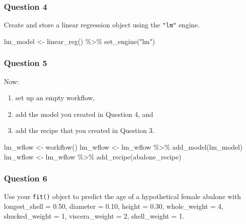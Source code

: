 \documentclass[
]{article}
\newenvironment{Shaded}{\begin{snugshade}}{\end{snugshade}}
\newcommand{\FunctionTok}[1]{\textcolor[rgb]{0.00,0.00,0.00}{#1}}
\newcommand{\NormalTok}[1]{#1}
\newcommand{\OtherTok}[1]{\textcolor[rgb]{0.56,0.35,0.01}{#1}}
\newcommand{\SpecialCharTok}[1]{\textcolor[rgb]{0.00,0.00,0.00}{#1}}
\newcommand{\StringTok}[1]{\textcolor[rgb]{0.31,0.60,0.02}{#1}}
\begin{document}
\hypertarget{question-4}{%
\subsubsection{Question 4}\label{question-4}}

Create and store a linear regression object using the \texttt{"lm"}
engine.

\begin{Shaded}
\begin{Highlighting}[]
\NormalTok{lm\_model }\OtherTok{\textless{}{-}} \FunctionTok{linear\_reg}\NormalTok{() }\SpecialCharTok{\%\textgreater{}\%} \FunctionTok{set\_engine}\NormalTok{(}\StringTok{"lm"}\NormalTok{)}
\end{Highlighting}
\end{Shaded}

\hypertarget{question-5}{%
\subsubsection{Question 5}\label{question-5}}

Now:

\begin{enumerate}
\def\labelenumi{\arabic{enumi}.}
\item
  set up an empty workflow,
\item
  add the model you created in Question 4, and
\item
  add the recipe that you created in Question 3.
\end{enumerate}

\begin{Shaded}
\begin{Highlighting}[]
\NormalTok{lm\_wflow }\OtherTok{\textless{}{-}} \FunctionTok{workflow}\NormalTok{()}
\NormalTok{lm\_wflow }\OtherTok{\textless{}{-}}\NormalTok{ lm\_wflow }\SpecialCharTok{\%\textgreater{}\%} \FunctionTok{add\_model}\NormalTok{(lm\_model)}
\NormalTok{lm\_wflow }\OtherTok{\textless{}{-}}\NormalTok{ lm\_wflow }\SpecialCharTok{\%\textgreater{}\%} \FunctionTok{add\_recipe}\NormalTok{(abalone\_recipe)}
\end{Highlighting}
\end{Shaded}

\hypertarget{question-6}{%
\subsubsection{Question 6}\label{question-6}}

Use your \texttt{fit()} object to predict the age of a hypothetical
female abalone with longest\_shell = 0.50, diameter = 0.10, height =
0.30, whole\_weight = 4, shucked\_weight = 1, viscera\_weight = 2,
shell\_weight = 1.
\end{document}

